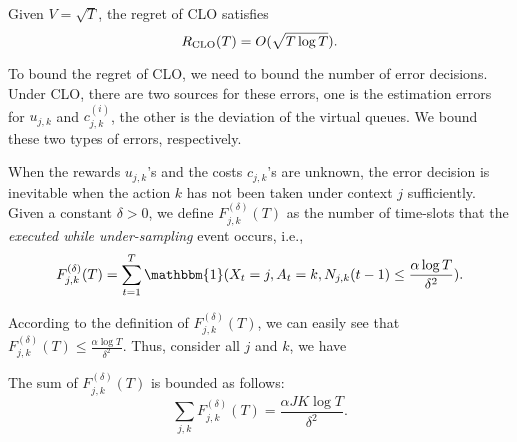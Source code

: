 \begin{theorem} \label{thm:regret_bound_clo}
Given $V = \sqrt{T}$,  the regret of CLO satisfies
\begin{equation}
R_{\rm CLO}(T) = O(\sqrt{T\log T}).
\end{equation}
\end{theorem}

To bound the regret of CLO, we need to bound the number of error decisions. Under CLO, there are two sources for these errors, one is the estimation errors for $u_{j,k}$ and $c_{j,k}^{(i)}$, the other is the deviation of the virtual queues. We bound these two types of errors, respectively.

When the rewards $u_{j,k}$'s and the costs $c_{j,k}$'s are unknown, the error decision is inevitable when the action $k$ has not been taken under context $j$ sufficiently.
Given a constant $\delta > 0$, we define $F^{(\delta)}_{j,k}(T)$ as the number of time-slots that the \emph{executed while under-sampling} event occurs, i.e.,
\begin{equation}
F^{(\delta)}_{j,k}(T) = \sum_{t = 1}^{T} \mathbbm{1}(X_{t} = j, A_{t} = k, N_{j,k}(t-1) \leq \frac{\alpha\log T}{\delta^2}).
\end{equation}

According to the definition of $F^{(\delta)}_{j,k}(T)$, we can easily see that $F^{(\delta)}_{j,k}(T) \leq \frac{\alpha\log T}{\delta^2}$. Thus, consider all $j$ and $k$, we have
\begin{lemma} \label{thm:prob_executed_undersampling}
The sum of $F^{(\delta)}_{j,k}(T)$ is bounded as follows:
\begin{equation}
\sum_{j,k} F^{(\delta)}_{j,k}(T) =  \frac{\alpha JK \log T}{\delta^2}.
\end{equation}
\end{lemma}

